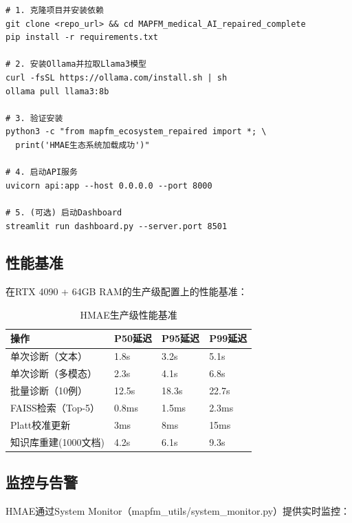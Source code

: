 \documentclass[11pt,a4paper]{ctexart}
\begin{document}
\begin{codebox}[HMAE生产级部署命令]
\small
\begin{verbatim}
# 1. 克隆项目并安装依赖
git clone <repo_url> && cd MAPFM_medical_AI_repaired_complete
pip install -r requirements.txt

# 2. 安装Ollama并拉取Llama3模型
curl -fsSL https://ollama.com/install.sh | sh
ollama pull llama3:8b

# 3. 验证安装
python3 -c "from mapfm_ecosystem_repaired import *; \
  print('HMAE生态系统加载成功')"

# 4. 启动API服务
uvicorn api:app --host 0.0.0.0 --port 8000

# 5. (可选) 启动Dashboard
streamlit run dashboard.py --server.port 8501
\end{verbatim}
\normalsize
\end{codebox}

\subsection{性能基准}

在RTX 4090 + 64GB RAM的生产级配置上的性能基准：

\begin{table}[H]
\centering
\small
\begin{tabular}{lp{3.5cm}p{3.5cm}p{3.5cm}}
\toprule
\textbf{操作} & \textbf{P50延迟} & \textbf{P95延迟} & \textbf{P99延迟} \\
\midrule
单次诊断（文本） & 1.8s & 3.2s & 5.1s \\
单次诊断（多模态） & 2.3s & 4.1s & 6.8s \\
批量诊断（10例） & 12.5s & 18.3s & 22.7s \\
FAISS检索（Top-5） & 0.8ms & 1.5ms & 2.3ms \\
Platt校准更新 & 3ms & 8ms & 15ms \\
知识库重建(1000文档) & 4.2s & 6.1s & 9.3s \\
\bottomrule
\end{tabular}
\caption{HMAE生产级性能基准}
\end{table}

\subsection{监控与告警}

HMAE通过System Monitor（mapfm\_utils/system\_monitor.py）提供实时监控：
\end{document}
